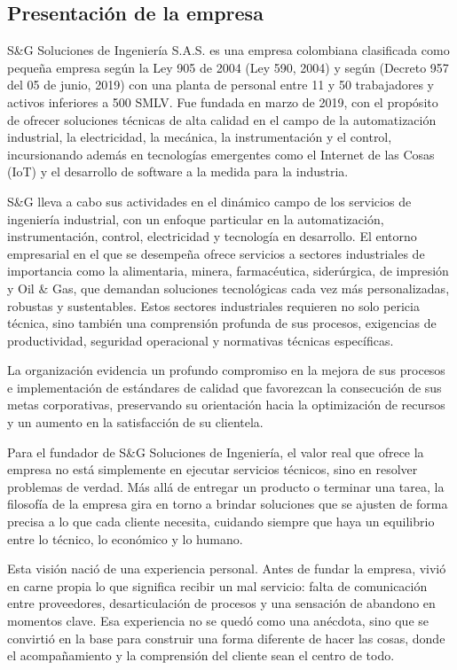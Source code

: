 \subsection{Presentación de la empresa}

S\&G Soluciones de Ingeniería S.A.S. es una empresa colombiana clasificada como pequeña empresa según la Ley 905 de 2004 (Ley 590, 2004) y según (Decreto 957 del 05 de junio, 2019) con una planta de personal entre 11 y 50 trabajadores y activos inferiores a 500 SMLV. Fue fundada en marzo de 2019, con el propósito de ofrecer soluciones técnicas de alta calidad en el campo de la automatización industrial, la electricidad, la mecánica, la instrumentación y el control, incursionando además en tecnologías emergentes como el Internet de las Cosas (IoT) y el desarrollo de software a la medida para la industria. \cite{anifcentrodeestudioseconomicosRetosOportunidadesPymes2021}

S\&G lleva a cabo sus actividades en el dinámico campo de los servicios de ingeniería industrial, con un enfoque particular en la automatización, instrumentación, control, electricidad y tecnología en desarrollo. El entorno empresarial en el que se desempeña ofrece servicios a sectores industriales de importancia como la alimentaria, minera, farmacéutica, siderúrgica, de impresión y Oil \& Gas, que demandan soluciones tecnológicas cada vez más personalizadas, robustas y sustentables.   Estos sectores industriales requieren no solo pericia técnica, sino también una comprensión profunda de sus procesos, exigencias de productividad, seguridad operacional y normativas técnicas específicas. \cite{aikhmadi2022}

La organización evidencia un profundo compromiso en la mejora de sus procesos e implementación de estándares de calidad que favorezcan la consecución de sus metas corporativas, preservando su orientación hacia la optimización de recursos y un aumento en la satisfacción de su clientela.

Para el fundador de S\&G Soluciones de Ingeniería, el valor real que ofrece la empresa no está simplemente en ejecutar servicios técnicos, sino en resolver problemas de verdad. Más allá de entregar un producto o terminar una tarea, la filosofía de la empresa gira en torno a brindar soluciones que se ajusten de forma precisa a lo que cada cliente necesita, cuidando siempre que haya un equilibrio entre lo técnico, lo económico y lo humano.

Esta visión nació de una experiencia personal. Antes de fundar la empresa, vivió en carne propia lo que significa recibir un mal servicio: falta de comunicación entre proveedores, desarticulación de procesos y una sensación de abandono en momentos clave. Esa experiencia no se quedó como una anécdota, sino que se convirtió en la base para construir una forma diferente de hacer las cosas, donde el acompañamiento y la comprensión del cliente sean el centro de todo.

